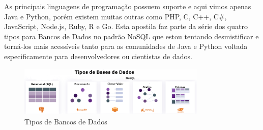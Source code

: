 As principais linguagens de programação possuem suporte e aqui vimos apenas Java e Python, porém existem muitas outras como PHP, C, C++, C\#, JavaScript, Node.js, Ruby, R e Go. Esta apostila faz parte da série dos quatro tipos para Bancos de Dados no padrão NoSQL que estou tentando desmistificar e torná-los mais acessíveis tanto para as comunidades de Java e Python voltada especificamente para desenvolvedores ou cientistas de dados.
\begin{figure}[H]
	\centering
	\includegraphics[width=0.8\textwidth]{../sty/NoSQL}
	\caption{Tipos de Bancos de Dados}
\end{figure}
